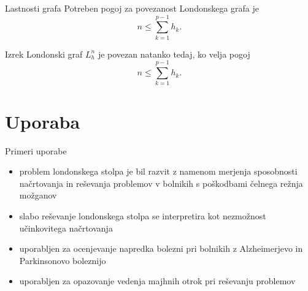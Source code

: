 \documentclass{beamer}
\begin{document}
\begin{frame}{Lastnosti grafa}
    Potreben pogoj za povezanost Londonskega grafa je 
    \[ n \leq \sum_{k=1}^{p-1} h_k. \]
    \begin{block}{Izrek}
        Londonski graf $L_h^n$ je povezan natanko tedaj, ko velja pogoj
        \[ n \leq \sum_{k=1}^{p-1} h_k. \]
    \end{block}
\end{frame}

\section{Uporaba}
\begin{frame}{Primeri uporabe}
    \begin{itemize}
        \item problem londonskega stolpa je bil razvit z namenom merjenja sposobnosti načrtovanja in reševanja problemov v bolnikih s poškodbami čelnega režnja možganov
        \item slabo reševanje londonskega stolpa se interpretira kot nezmožnost učinkovitega načrtovanja
        \item uporabljen za ocenjevanje napredka bolezni pri bolnikih z Alzheimerjevo in Parkinsonovo boleznijo
        \item uporabljen za opazovanje vedenja majhnih otrok pri reševanju problemov
    \end{itemize}
\end{frame}
\end{document}
